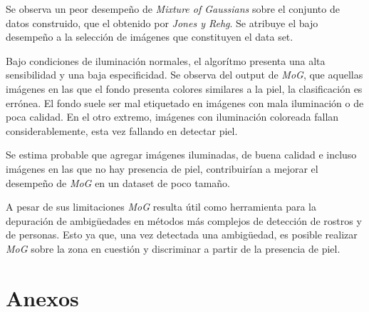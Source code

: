 \documentclass[12pt]{article}
\begin{document}

Se observa un peor desempeño de \emph{Mixture of Gaussians} sobre el conjunto de datos construido, que el obtenido por \emph{Jones y Rehg}.
Se atribuye el bajo desempeño a la selección de imágenes que constituyen el data set. 

Bajo condiciones de iluminación normales, el algorítmo presenta una alta sensibilidad y una baja especificidad.
Se observa del output de \emph{MoG}, que aquellas imágenes en las que el fondo
presenta colores similares a la piel, la clasificación es errónea. El fondo suele ser mal etiquetado en imágenes con mala iluminación o de poca calidad.
En el otro extremo, imágenes con iluminación coloreada fallan considerablemente, esta vez fallando en detectar piel. 

Se estima probable que agregar imágenes iluminadas, de buena calidad e incluso imágenes en las que no hay presencia de piel, contribuirían
a mejorar el desempeño de \emph{MoG} en un dataset de poco tamaño.

A pesar de sus limitaciones \emph{MoG} resulta útil como herramienta para la depuración de ambigüedades
en métodos más complejos de detección de rostros y de personas. Esto ya que, una vez detectada una ambigüedad,
es posible realizar \emph{MoG} sobre la zona en cuestión y discriminar a partir de la presencia de piel.





%

\section{Anexos}
\begingroup
\centering
{}
\label{fig:f}
\endgroup
\end{document}
